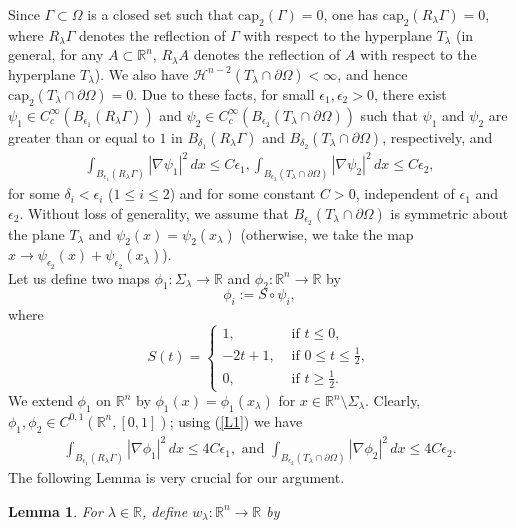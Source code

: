 \documentclass[11pt, notitlepage]{article}
\def\R{\mathbb{R}}
\newtheorem{Lemma}[Theorem]{Lemma}
\begin{document}
{Since $\Gamma\subset\Omega$ is a closed set such that $\mathrm{cap}_2(\Gamma)=0$, one has $\mathrm{cap}_2(R_\lambda\Gamma)=0$, where $R_\lambda\Gamma$ denotes the reflection of $\Gamma$ with respect to the hyperplane $T_\lambda$ (in general, for any $A\subset \R^n$, $R_\lambda A$ denotes the reflection of $A$ with respect to the hyperplane $T_\lambda$). We also have $\mathcal{H}^{n-2}(T_\lambda\cap \partial\Omega)<\infty$, and hence $\mathrm{cap}_2(T_\lambda\cap\partial\Omega)=0$. Due to these facts, for small $\epsilon_1,\epsilon_2>0$, there exist $\psi_1\in C^\infty_c(B_{\epsilon_1}(R_\lambda\Gamma))$ and $\psi_2\in C^\infty_c(B_{\epsilon_2}(T_\lambda\cap\partial\Omega))$ such that $ \psi_1$ and $\psi_2$ are greater than or equal to $1$ in $B_{\delta_1}(R_\lambda\Gamma)$ and $B_{\delta_2}(T_\lambda\cap\partial\Omega)$, respectively, and
\begin{align}\label{L1}
        \int_{B_{\epsilon_1}(R_\lambda\Gamma)}|\nabla \psi_1|^2\,dx\leq C\epsilon_1,\int_{B_{\epsilon_2}(T_\lambda\cap\partial\Omega)}|\nabla \psi_2|^2\,dx\leq C\epsilon_2,
\end{align}
for some $\delta_i<\epsilon_i$ ($1\leq i\leq 2$) and for some constant $C>0$, independent of $\epsilon_1$ and $\epsilon_2$. Without loss of generality, we assume that $B_{\epsilon_2}(T_\lambda\cap\partial\Omega)$ is symmetric about the plane $T_\lambda$ and $\psi_2(x)=\psi_2(x_\lambda)$ (otherwise, we take the map $x\to\psi_{\epsilon_2}(x)+\psi_{\epsilon_2}(x_\lambda)$).\\
Let us define two maps $\phi_1:\Sigma_\lambda\to \R$ and $\phi_2:\R^n\to \R$ by $$\phi_i:=S\circ\psi_i,$$
where $$S(t)=\begin{cases}
    1,&\text{ if }t\leq 0,\\
    -2t+1,&\text{ if }0\leq t\leq\frac{1}{2},\\
    0,&\text{ if }t\geq \frac{1}{2}.
\end{cases}$$
We extend $\phi_1$ on $\R^n$ by $\phi_1(x)=\phi_1(x_\lambda)$ for $x\in\R^n\setminus\Sigma_\lambda$.
Clearly, $\phi_1,\phi_2\in C^{0,1}(\R^n,[0,1])$; using (\ref{L1}) we have
\begin{align}\label{Ranjit1}
       \int_{B_{\epsilon_1}(R_\lambda\Gamma)}|\nabla \phi_1|^2\,dx\leq 4C\epsilon_1,\text{ and }\int_{B_{\epsilon_2}(T_\lambda\cap\partial\Omega)}|\nabla \phi_2|^2\,dx\leq 4C\epsilon_2.
\end{align}
The following Lemma is very crucial for our argument. 
\begin{Lemma}\label{MLemma}
    For $\lambda\in\R$, define $w_\lambda:\R^n\to\R$ by 

\end{Lemma}}
\end{document}
